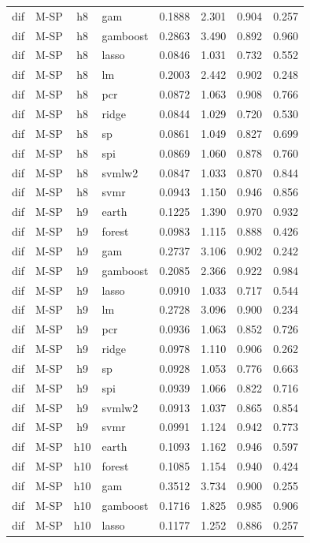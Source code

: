 \begin{ThreePartTable}
\begin{longtable}[t]{llclcccc}
dif & M-SP & h8 & gam & 0.1888 & 2.301 & 0.904 & 0.257\\
dif & M-SP & h8 & gamboost & 0.2863 & 3.490 & 0.892 & 0.960\\
dif & M-SP & h8 & lasso & 0.0846 & 1.031 & 0.732 & 0.552\\
dif & M-SP & h8 & lm & 0.2003 & 2.442 & 0.902 & 0.248\\
dif & M-SP & h8 & pcr & 0.0872 & 1.063 & 0.908 & 0.766\\
dif & M-SP & h8 & ridge & 0.0844 & 1.029 & 0.720 & 0.530\\
dif & M-SP & h8 & sp & 0.0861 & 1.049 & 0.827 & 0.699\\
dif & M-SP & h8 & spi & 0.0869 & 1.060 & 0.878 & 0.760\\
dif & M-SP & h8 & svmlw2 & 0.0847 & 1.033 & 0.870 & 0.844\\
dif & M-SP & h8 & svmr & 0.0943 & 1.150 & 0.946 & 0.856\\
\addlinespace
dif & M-SP & h9 & earth & 0.1225 & 1.390 & 0.970 & 0.932\\
dif & M-SP & h9 & forest & 0.0983 & 1.115 & 0.888 & 0.426\\
dif & M-SP & h9 & gam & 0.2737 & 3.106 & 0.902 & 0.242\\
dif & M-SP & h9 & gamboost & 0.2085 & 2.366 & 0.922 & 0.984\\
dif & M-SP & h9 & lasso & 0.0910 & 1.033 & 0.717 & 0.544\\
dif & M-SP & h9 & lm & 0.2728 & 3.096 & 0.900 & 0.234\\
dif & M-SP & h9 & pcr & 0.0936 & 1.063 & 0.852 & 0.726\\
dif & M-SP & h9 & ridge & 0.0978 & 1.110 & 0.906 & 0.262\\
dif & M-SP & h9 & sp & 0.0928 & 1.053 & 0.776 & 0.663\\
dif & M-SP & h9 & spi & 0.0939 & 1.066 & 0.822 & 0.716\\
dif & M-SP & h9 & svmlw2 & 0.0913 & 1.037 & 0.865 & 0.854\\
dif & M-SP & h9 & svmr & 0.0991 & 1.124 & 0.942 & 0.773\\
\addlinespace
dif & M-SP & h10 & earth & 0.1093 & 1.162 & 0.946 & 0.597\\
dif & M-SP & h10 & forest & 0.1085 & 1.154 & 0.940 & 0.424\\
dif & M-SP & h10 & gam & 0.3512 & 3.734 & 0.900 & 0.255\\
dif & M-SP & h10 & gamboost & 0.1716 & 1.825 & 0.985 & 0.906\\
dif & M-SP & h10 & lasso & 0.1177 & 1.252 & 0.886 & 0.257\\

\end{longtable}
\end{ThreePartTable}
